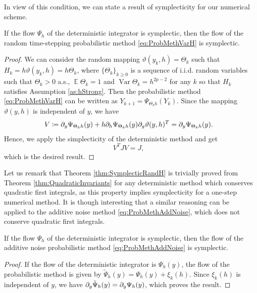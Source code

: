 \documentclass{siamart1116}
\numberwithin{theorem}{section}
\newcommand{\pdv}[2]{\ensuremath\partial_{#2}#1}
\newcommand{\defeq}{\coloneqq}
\newcommand{\Var}{\operatorname{Var}}
\newcommand{\E}{\operatorname{\mathbb{E}}}
\begin{document}
In view of this condition, we can state a result of symplecticity for our numerical scheme.
\begin{theorem}\label{thm:SymplecticRandH} If the flow $\Psi_h$ of the deterministic integrator is symplectic, then the flow of the random time-stepping probabilistic method \eqref{eq:ProbMethVarH} is symplectic.
\end{theorem}
\begin{proof} We can consider the random mapping $\vartheta(y_k, h) = \Theta_k$ such that $H_k = h\vartheta(y_k, h) = h\Theta_k$, where $\{\Theta_k\}_{k \geq 0}$ is a sequence of i.i.d. random variables such that $\Theta_k > 0$ a.s., $\E\Theta_k = 1$ and $\Var\Theta_k = h^{2p - 2}$ for any $k$ so that $H_k$ satisfies Assumption \ref{as:hStrong}. Then the probabilistic method \eqref{eq:ProbMethVarH} can be written as $Y_{k+1} = \Psi_{\Theta_k h}(Y_{k})$. Since the mapping $\vartheta(y, h)$ is independent of $y$, we have
	\begin{equation}
	V \defeq \pdv{\Psi_{\Theta_k h}(y)}{y} + h\pdv{\Psi_{\Theta_k h}(y)}{h}\pdv{\vartheta(y, h)}{y}^T = \pdv{\Psi_{\Theta_k h}(y)}{y}.
	\end{equation}
	Hence, we apply the simplecticity of the deterministic method and get
	\begin{equation}
	V^T J V = J,
	\end{equation}
	which is the desired result.
\end{proof}

Let us remark that Theorem \ref{thm:SymplecticRandH} is trivially proved from Theorem \ref{thm:QuadraticInvariants} for any deterministic method which conserves quadratic first integrals, as this property implies symplecticity for a one-step numerical method. It is though interesting that a similar reasoning can be applied to the additive noise method \eqref{eq:ProbMethAddNoise}, which does not conserve quadratic first integrals. 
\begin{theorem}\label{thm:SymplecticAddNoise} If the flow $\Psi_h$ of the deterministic integrator is symplectic, then the flow of the additive noise probabilistic method \eqref{eq:ProbMethAddNoise} is symplectic.
\end{theorem}
\begin{proof} If the flow of the deterministic integrator is $\Psi_h(y)$, the flow of the probabilistic method is given by $\tilde\Psi_h(y) = \Psi_h(y) + \xi_k(h)$. Since $\xi_k(h)$ is independent of $y$, we have $\pdv{\tilde\Psi_h(y)}{y} = \pdv{\Psi_h(y)}{y}$, which proves the result.	
\end{proof}
\end{document}
